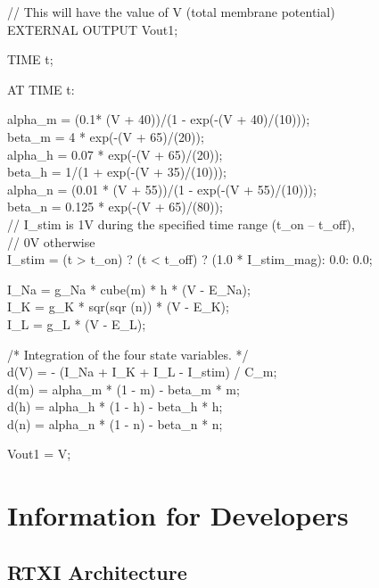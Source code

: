 \begin{maxipage}
\begin{example}

// This will have the value of V (total membrane potential)\\
EXTERNAL OUTPUT Vout1;

TIME t;

AT TIME t:

alpha\_m  = (0.1* (V + 40))/(1 - exp(-(V + 40)/(10)));\\
beta\_m   = 4 * exp(-(V + 65)/(20));\\
alpha\_h  = 0.07 * exp(-(V + 65)/(20));\\
beta\_h   = 1/(1 + exp(-(V + 35)/(10)));\\
alpha\_n  = (0.01 * (V + 55))/(1 - exp(-(V + 55)/(10)));\\
beta\_n   = 0.125 * exp(-(V + 65)/(80));\\

// I\_stim is 1V during the specified time range (t\_on -- t\_off), \\
// 0V otherwise  \\
I\_stim   = (t > t\_on) ? (t < t\_off) ? (1.0 * I\_stim\_mag): 0.0: 0.0;

I\_Na     = g\_Na * cube(m) * h * (V - E\_Na);\\
I\_K 	 = g\_K * sqr(sqr (n)) * (V - E\_K);\\
I\_L	 = g\_L * (V - E\_L);

/* Integration of the four state variables. */\\
d(V) = - (I\_Na + I\_K + I\_L - I\_stim) / C\_m;\\
d(m) = alpha\_m * (1 - m) - beta\_m * m;\\
d(h) = alpha\_h * (1 - h) - beta\_h * h;\\
d(n) = alpha\_n * (1 - n) - beta\_n * n;

Vout1 = V;

\end{example}
\end{maxipage}


\section{Information for Developers}

\subsection{RTXI Architecture}

